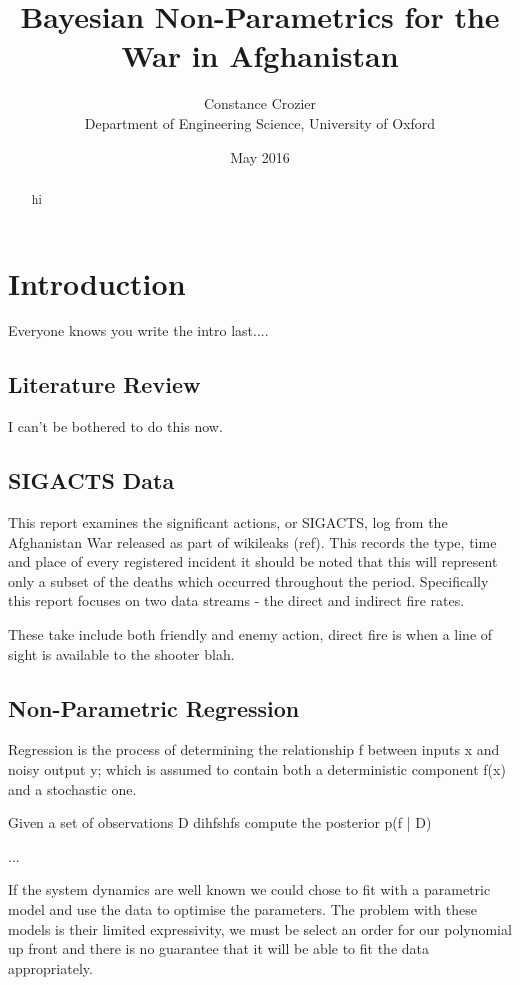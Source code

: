 \documentclass[a4paper,11pt]{report}
\author{Constance Crozier\\Department of Engineering Science, University of Oxford}
\title{Bayesian Non-Parametrics for the War in Afghanistan}
\date{May 2016}
\begin{document}
\maketitle

\begin{abstract}
hi
\end{abstract}

\singlespacing
\pagestyle{plain}
\tableofcontents
\doublespacing

\pagebreak

\chapter{Introduction}
Everyone knows you write the intro last....

\section{Literature Review}
I can't be bothered to do this now.

\section{SIGACTS Data}
This report examines the significant actions, or SIGACTS, log from the Afghanistan War released as part of wikileaks (ref). This records the type, time and place of every registered incident it should be noted that this will represent only a subset of the deaths which occurred throughout the period. Specifically this report focuses on two data streams - the direct and indirect fire rates. 

These take include both friendly and enemy action, direct fire is when a line of sight is available to the shooter blah.

\section{Non-Parametric Regression}

Regression is the process of determining the relationship f between inputs x and noisy output y; which is assumed to contain both a deterministic component f(x) and a stochastic one.

Given a set of observations D dihfshfs compute the posterior p(f | D) 


...

If the system dynamics are well known we could chose to fit with a parametric model and use the data to optimise the parameters. The problem with these models is their limited expressivity, we must be select an order for our polynomial up front and there is no guarantee that it will be able to fit the data appropriately.
\end{document}
